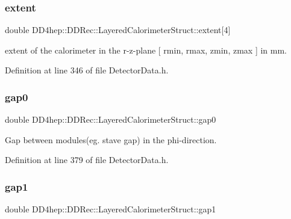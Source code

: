 \subsubsection{\texorpdfstring{extent}{extent}}
{\footnotesize\ttfamily double D\+D4hep\+::\+D\+D\+Rec\+::\+Layered\+Calorimeter\+Struct\+::extent\mbox{[}4\mbox{]}}



extent of the calorimeter in the r-\/z-\/plane \mbox{[} rmin, rmax, zmin, zmax \mbox{]} in mm. 



Definition at line 346 of file Detector\+Data.\+h.

\hypertarget{struct_d_d4hep_1_1_d_d_rec_1_1_layered_calorimeter_struct_aab4f81fe9fc897a94eadbd59ff308bdb}{}\label{struct_d_d4hep_1_1_d_d_rec_1_1_layered_calorimeter_struct_aab4f81fe9fc897a94eadbd59ff308bdb} 
\subsubsection{\texorpdfstring{gap0}{gap0}}
{\footnotesize\ttfamily double D\+D4hep\+::\+D\+D\+Rec\+::\+Layered\+Calorimeter\+Struct\+::gap0}



Gap between modules(eg. stave gap) in the phi-\/direction. 



Definition at line 379 of file Detector\+Data.\+h.

\hypertarget{struct_d_d4hep_1_1_d_d_rec_1_1_layered_calorimeter_struct_a0b341d9a31ccf086d69dc2602eed2eec}{}\label{struct_d_d4hep_1_1_d_d_rec_1_1_layered_calorimeter_struct_a0b341d9a31ccf086d69dc2602eed2eec} 
\subsubsection{\texorpdfstring{gap1}{gap1}}
{\footnotesize\ttfamily double D\+D4hep\+::\+D\+D\+Rec\+::\+Layered\+Calorimeter\+Struct\+::gap1}



